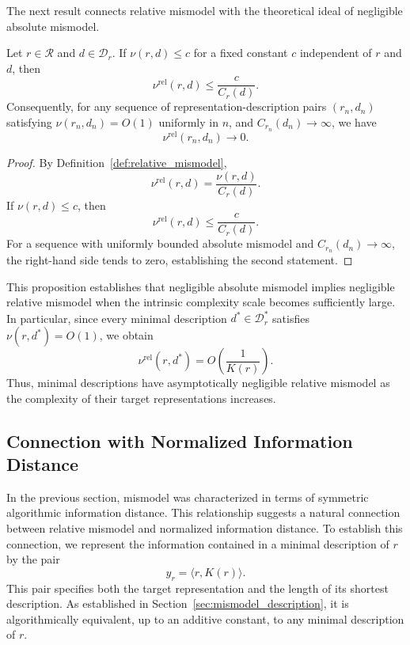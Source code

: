 The next result connects relative mismodel with the theoretical ideal of negligible absolute mismodel.

\begin{proposition}
\label{prop:small_abs_implies_small_rel_mismodel}
Let $r\in\mathcal R$ and $d\in\mathcal D_r$. If $\nu(r,d)\le c$ for a fixed constant $c$ independent of $r$ and $d$, then
\[
\nu^{\mathrm{rel}}(r,d)\le\frac{c}{C_r(d)}.
\]
Consequently, for any sequence of representation-description pairs $(r_n,d_n)$ satisfying $\nu(r_n,d_n)=O(1)$ uniformly in $n$, and $C_{r_n}(d_n)\to\infty$, we have
\[
\nu^{\mathrm{rel}}(r_n,d_n)\to 0.
\]
\end{proposition}
\begin{proof}
By Definition~\ref{def:relative_mismodel},
\[
\nu^{\mathrm{rel}}(r,d) = \frac{\nu(r,d)}{C_r(d)}.
\]
If $\nu(r,d)\le c$, then
\[
\nu^{\mathrm{rel}}(r,d)\le\frac{c}{C_r(d)}.
\]
For a sequence with uniformly bounded absolute mismodel and $C_{r_n}(d_n)\to\infty$, the right-hand side tends to zero, establishing the second statement.
\end{proof}

This proposition establishes that negligible absolute mismodel implies negligible relative mismodel when the intrinsic complexity scale becomes sufficiently large. In particular, since every minimal description $d^\ast\in\mathcal D_r^\ast$ satisfies $\nu(r,d^\ast)=O(1)$, we obtain
\[
\nu^{\mathrm{rel}}(r,d^\ast) = O\left(\frac{1}{K(r)}\right).
\]
Thus, minimal descriptions have asymptotically negligible relative mismodel as the complexity of their target representations increases.


\subsection*{Connection with Normalized Information Distance}

In the previous section, mismodel was characterized in terms of symmetric algorithmic information distance. This relationship suggests a natural connection between relative mismodel and normalized information distance. To establish this connection, we represent the information contained in a minimal description of $r$ by the pair
\[
y_r =\langle r,K(r)\rangle.
\]
This pair specifies both the target representation and the length of its shortest description. As established in Section~\ref{sec:mismodel_description}, it is algorithmically equivalent, up to an additive constant, to any minimal description of $r$.


